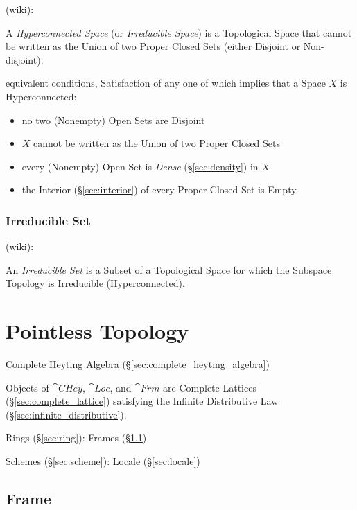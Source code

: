 (wiki):

A \emph{Hyperconnected Space} (or \emph{Irreducible Space}) is a Topological
Space that cannot be written as the Union of two Proper Closed Sets (either
Disjoint or Non-disjoint).

equivalent conditions, Satisfaction of any one of which implies that a Space
$X$ is Hyperconnected:
\begin{itemize}
  \item no two (Nonempty) Open Sets are Disjoint
  \item $X$ cannot be written as the Union of two Proper Closed Sets
  \item every (Nonempty) Open Set is \emph{Dense} (\S\ref{sec:density}) in $X$
  \item the Interior (\S\ref{sec:interior}) of every Proper Closed Set is Empty
\end{itemize}



\subsubsection{Irreducible Set}\label{sec:irreducible_set}

(wiki):

An \emph{Irreducible Set} is a Subset of a Topological Space for which the
Subspace Topology is Irreducible (Hyperconnected).



\section{Pointless Topology}\label{sec:pointless_topology}

Complete Heyting Algebra (\S\ref{sec:complete_heyting_algebra})

Objects of $\cat{CHey}$, $\cat{Loc}$, and $\cat{Frm}$ are Complete
Lattices (\S\ref{sec:complete_lattice}) satisfying the Infinite
Distributive Law (\S\ref{sec:infinite_distributive}).

Rings (\S\ref{sec:ring}): Frames (\S\ref{sec:frame})

Schemes (\S\ref{sec:scheme}): Locale (\S\ref{sec:locale})



\subsection{Frame}\label{sec:frame}

